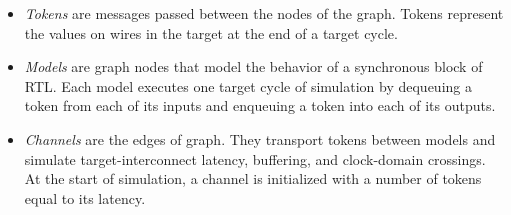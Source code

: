 \begin{itemize}
    \item \emph{Tokens} are messages passed between the nodes of the graph. Tokens represent
        the values on wires in the target at the end of a target cycle.
    \item \emph{Models} are graph nodes that model the behavior of a
        synchronous block of RTL. Each model executes one target cycle of
        simulation by dequeuing a token from each of its inputs and enqueuing
        a token into each of its outputs.
    \item \emph{Channels} are the edges of graph. They transport tokens
        between models and simulate target-interconnect latency, buffering, and clock-domain crossings. At the start of simulation, a channel is initialized with
        a number of tokens equal to its latency.
\end{itemize}
%
%

